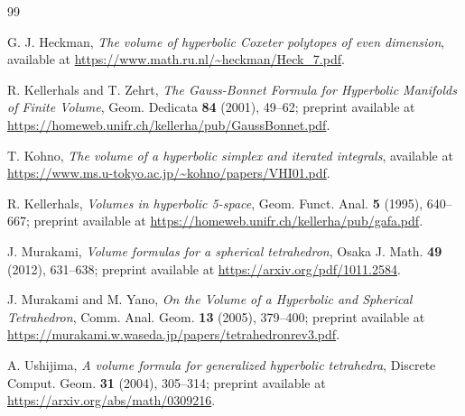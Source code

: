 \documentclass[11pt]{article}
\begin{document}
\begin{thebibliography}{99}

G. J. Heckman,
\emph{The volume of hyperbolic Coxeter polytopes of even dimension},
available at \url{https://www.math.ru.nl/~heckman/Heck_7.pdf}.

R. Kellerhals and T. Zehrt,
\emph{The Gauss-Bonnet Formula for Hyperbolic Manifolds of Finite Volume},
Geom. Dedicata \textbf{84} (2001), 49--62;
preprint available at \url{https://homeweb.unifr.ch/kellerha/pub/GaussBonnet.pdf}.

T. Kohno,
\emph{The volume of a hyperbolic simplex and iterated integrals},
available at \url{https://www.ms.u-tokyo.ac.jp/~kohno/papers/VHI01.pdf}.

R. Kellerhals,
\emph{Volumes in hyperbolic 5-space},
Geom. Funct. Anal. \textbf{5} (1995), 640--667;
preprint available at \url{https://homeweb.unifr.ch/kellerha/pub/gafa.pdf}.

J. Murakami,
\emph{Volume formulas for a spherical tetrahedron},
Osaka J. Math. \textbf{49} (2012), 631--638;
preprint available at \url{https://arxiv.org/pdf/1011.2584}.

J. Murakami and M. Yano,
\emph{On the Volume of a Hyperbolic and Spherical Tetrahedron},
Comm. Anal. Geom. \textbf{13} (2005), 379--400;
preprint available at \url{https://murakami.w.waseda.jp/papers/tetrahedronrev3.pdf}.

A. Ushijima,
\emph{A volume formula for generalized hyperbolic tetrahedra},
Discrete Comput. Geom. \textbf{31} (2004), 305--314;
preprint available at \url{https://arxiv.org/abs/math/0309216}.

\end{thebibliography}
\end{document}
